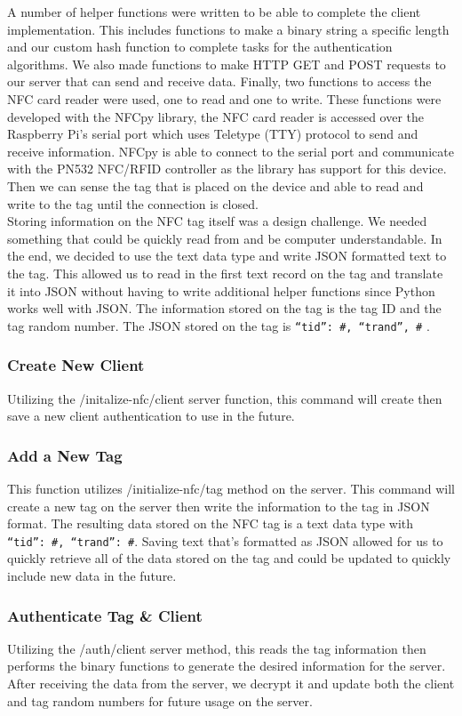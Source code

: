 A number of helper functions were written to be able to complete the client implementation. This includes functions to make a binary string a specific length and our custom hash function to complete tasks for the authentication algorithms. We also made functions to make HTTP GET and POST requests to our server that can send and receive data. Finally, two functions to access the NFC card reader were used, one to read and one to write. These functions were developed with the NFCpy library, the NFC card reader is accessed over the Raspberry Pi’s serial port which uses Teletype (TTY) protocol to send and receive information. NFCpy is able to connect to the serial port and communicate with the PN532 NFC/RFID controller as the library has support for this device. Then we can sense the tag that is placed on the device and able to read and write to the tag until the connection is closed.\\

Storing information on the NFC tag itself was a design challenge. We needed something that could be quickly read from and be computer understandable. In the end, we decided to use the text data type and write JSON formatted text to the tag. This allowed us to read in the first text record on the tag and translate it into JSON without having to write additional helper functions since Python works well with JSON. The information stored on the tag is the tag ID and the tag random number. The JSON stored on the tag is { \verb|“tid”: #, “trand”, #| }.\\

\subsubsection{Create New Client}
Utilizing the /initalize-nfc/client server function, this command will create then save a new client authentication to use in the future. 
\subsubsection{Add a New Tag}
This function utilizes /initialize-nfc/tag method on the server. This command will create a new tag on the server then write the information to the tag in JSON format. The resulting data stored on the NFC tag is a text data type with {\verb|“tid”: #, “trand”: #|}. Saving text that’s formatted as JSON allowed for us to quickly retrieve all of the data stored on the tag and could be updated to quickly include new data in the future. 
\subsubsection{Authenticate Tag \& Client}
Utilizing the /auth/client server method, this reads the tag information then performs the binary functions to generate the desired information for the server. After receiving the data from the server, we decrypt it and update both the client and tag random numbers for future usage on the server. 
